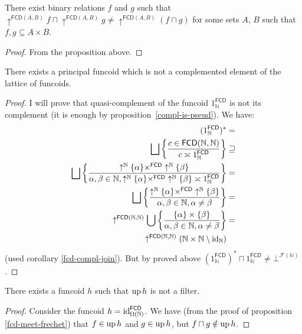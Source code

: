 \begin{example}
There exist binary relations $f$ and $g$ such that $\uparrow^{\mathsf{FCD}(A,B)}f\sqcap\uparrow^{\mathsf{FCD}(A,B)}g\ne\uparrow^{\mathsf{FCD}(A,B)}(f\cap g)$
for some sets $A$, $B$ such that $f,g\subseteq A\times B$.\end{example}
\begin{proof}
From the proposition above.\end{proof}
\begin{example}
There exists a principal funcoid which is not a complemented element
of the lattice of funcoids.\end{example}
\begin{proof}
I will prove that quasi-complement of the funcoid $1_{\mathbb{N}}^{\mathsf{FCD}}$
is not its complement (it is enough by proposition~\ref{compl-is-pseud}). We have:
\begin{align*}
(1_{\mathbb{N}}^{\mathsf{FCD}})^{\ast} & =\\
\bigsqcup\setcond{c\in\mathsf{FCD}(\mathbb{N},\mathbb{N})}{c\asymp1_{\mathbb{N}}^{\mathsf{FCD}}} & \sqsupseteq\\
\bigsqcup\setcond{\uparrow^{\mathbb{N}}\{\alpha\}\times^{\mathsf{FCD}}\uparrow^{\mathbb{N}}\{\beta\}}{\alpha,\beta\in\mathbb{N},\uparrow^{\mathbb{N}}\{\alpha\}\times^{\mathsf{FCD}}\uparrow^{\mathbb{N}}\{\beta\}\asymp1_{\mathbb{N}}^{\mathsf{FCD}}} & =\\
\bigsqcup\setcond{\uparrow^{\mathbb{N}}\{\alpha\}\times^{\mathsf{FCD}}\uparrow^{\mathbb{N}}\{\beta\}}{\alpha,\beta\in\mathbb{N},\alpha\ne\beta} & =\\
\uparrow^{\mathsf{FCD}(\mathbb{N},\mathbb{N})}\bigcup\setcond{\{\alpha\}\times\{\beta\}}{\alpha,\beta\in\mathbb{N},\alpha\ne\beta} & =\\
\uparrow^{\mathsf{FCD}(\mathbb{N},\mathbb{N})}(\mathbb{N}\times\mathbb{N}\setminus\id_{\mathbb{N}})
\end{align*}
(used corollary \ref{fcd-compl-join}). But by proved above $(1_{\mathbb{N}}^{\mathsf{FCD}})^{\ast}\sqcap1_{\mathbb{N}}^{\mathsf{FCD}}\ne\bot^{\mathscr{F}(\mathbb{N})}$.\end{proof}
\begin{example}
There exists a funcoid $h$ such that $\operatorname{up} h$ is not a filter.\end{example}
\begin{proof}
Consider the funcoid $h={\operatorname{id}}_{\Omega(\mathbb{N})}^{\mathsf{FCD}}$.
We have (from the proof of proposition \ref{fcd-meet-frechet}) that
$f\in\operatorname{up} h$ and $g\in\operatorname{up} h$, but $f\sqcap g\notin\operatorname{up} h$.\end{proof}
